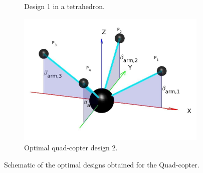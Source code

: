 \begin{figure}[!h]
{\begin{subfigure}[b]{0.35\textwidth}
    \caption{Design 1 in a tetrahedron.} \label{fig:Quadcopter_resultb}
  \end{subfigure}
  \hspace*{\fill} %
  \begin{subfigure}[b]{0.45\textwidth}
    \includegraphics[width=\linewidth]{images/Quadcopter2.jpg}
    \caption{Optimal quad-copter design 2.} \label{fig:Quadcopter_resultc}
  \end{subfigure}}
  \caption{Schematic of the optimal designs obtained for the Quad-copter.}
  \label{fig:Quadcopter_result}
\end{figure}

